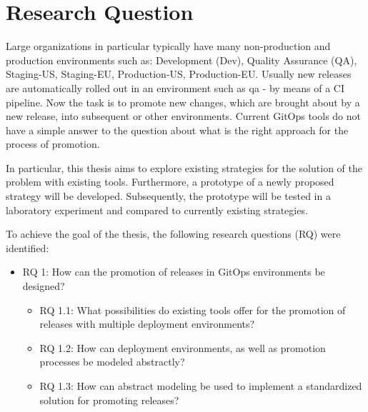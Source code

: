 \chapter{Research Question}

%
Large organizations in particular typically have many
non-production and production environments
such as:
Development (Dev),
Quality Assurance (QA),
Staging-US,
Staging-EU,
Production-US,
Production-EU.
Usually new releases are automatically rolled out in an environment
such as qa - by means of a CI pipeline.
Now the task is to promote
new changes, which are brought about by a new release,
into subsequent or other environments.
Current GitOps tools do not have a simple answer to
the question about what is the right approach for the process of promotion.
\bigskip

\noindent
In particular, this thesis aims to explore
existing strategies for the solution of the problem
with existing tools.
Furthermore, a prototype of a newly proposed strategy will be developed.
Subsequently, the prototype will be tested in a laboratory experiment
and compared to currently existing strategies.
\bigskip

\noindent
To achieve the goal of the thesis, the following research questions (RQ) were identified:

\begin{itemize}
	\item RQ 1: How can the promotion of releases in GitOps environments be designed?
	\begin{itemize}
		\item RQ 1.1: What possibilities do existing tools offer for the promotion of releases with multiple deployment environments?
		\item RQ 1.2: How can deployment environments, as well as promotion processes be modeled abstractly?
		\item RQ 1.3: How can abstract modeling be used to implement a standardized solution for promoting releases?
	\end{itemize}
\end{itemize}



